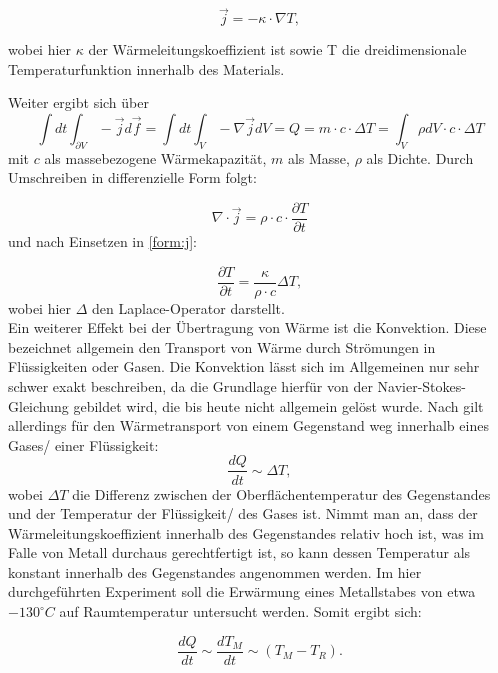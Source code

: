 \begin{equation}
\vec{j} = - \kappa \cdot \nabla T, 
\label{form:j}
\end{equation}

wobei hier $ \kappa $ der Wärmeleitungskoeffizient ist sowie T die dreidimensionale Temperaturfunktion innerhalb des Materials. 

Weiter ergibt sich über
\begin{equation}
\int dt \int_{\partial V} -\vec{j} d \vec{f} = \int dt \int_{V} -\nabla \vec{j} dV = Q = m \cdot c \cdot \Delta T = \int_{V} \rho dV \cdot c \cdot \Delta T
\end{equation}
mit $c$ als massebezogene Wärmekapazität, $m$ als Masse, $\rho$ als Dichte. Durch Umschreiben in differenzielle Form folgt: 

\begin{equation}
\nabla \cdot \vec{j} = \rho \cdot c \cdot  \frac{\partial T}{\partial t}
\end{equation} 
und nach Einsetzen in \ref{form:j}: 

\begin{equation}
\frac{\partial T}{\partial t} = \frac{\kappa}{\rho \cdot c} \Delta T, 
\end{equation}
wobei hier $\Delta$ den Laplace-Operator darstellt. 
\\
Ein weiterer Effekt bei der Übertragung von Wärme ist die Konvektion. Diese bezeichnet allgemein den Transport von Wärme durch Strömungen in Flüssigkeiten oder Gasen. Die Konvektion lässt sich im Allgemeinen nur sehr schwer exakt beschreiben, da die Grundlage hierfür von der Navier-Stokes-Gleichung gebildet wird, die bis heute nicht allgemein gelöst wurde. Nach \cite{praktikumwaerme} gilt allerdings für den Wärmetransport von einem Gegenstand weg innerhalb eines Gases/ einer Flüssigkeit: 
\begin{equation}
\frac{dQ}{dt} \sim \Delta T,
\end{equation}
wobei $\Delta T$ die Differenz zwischen der Oberflächentemperatur des Gegenstandes und der Temperatur der Flüssigkeit/ des Gases ist. 
Nimmt man an, dass der Wärmeleitungskoeffizient innerhalb des Gegenstandes relativ hoch ist, was im Falle von Metall durchaus gerechtfertigt ist, so kann dessen Temperatur als konstant innerhalb des Gegenstandes angenommen werden. 
Im hier durchgeführten Experiment soll die Erwärmung eines Metallstabes von etwa $ -130 ^{\circ} C $ auf Raumtemperatur untersucht werden. Somit ergibt sich: 

\begin{equation}
\frac{dQ}{dt} \sim  \frac{dT_M}{dt} \sim (T_{M} - T_{R}). 
\end{equation}

